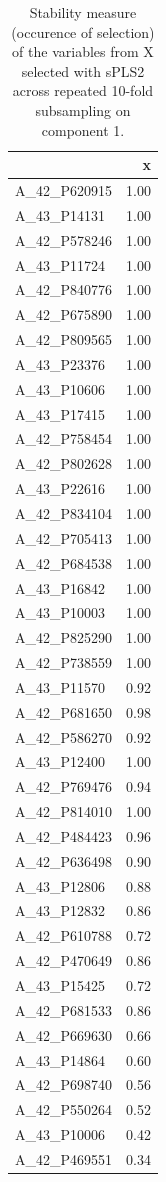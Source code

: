 \documentclass[]{book}
\begin{document}
\begin{longtable}[t]{l|r}
\caption{\label{tab:pls2stability}Stability measure (occurence of selection) of the variables from X selected with sPLS2 across repeated 10-fold subsampling on component 1.}\\
\hline
  & x\\
\hline
A\_42\_P620915 & 1.00\\
\hline
A\_43\_P14131 & 1.00\\
\hline
A\_42\_P578246 & 1.00\\
\hline
A\_43\_P11724 & 1.00\\
\hline
A\_42\_P840776 & 1.00\\
\hline
A\_42\_P675890 & 1.00\\
\hline
A\_42\_P809565 & 1.00\\
\hline
A\_43\_P23376 & 1.00\\
\hline
A\_43\_P10606 & 1.00\\
\hline
A\_43\_P17415 & 1.00\\
\hline
A\_42\_P758454 & 1.00\\
\hline
A\_42\_P802628 & 1.00\\
\hline
A\_43\_P22616 & 1.00\\
\hline
A\_42\_P834104 & 1.00\\
\hline
A\_42\_P705413 & 1.00\\
\hline
A\_42\_P684538 & 1.00\\
\hline
A\_43\_P16842 & 1.00\\
\hline
A\_43\_P10003 & 1.00\\
\hline
A\_42\_P825290 & 1.00\\
\hline
A\_42\_P738559 & 1.00\\
\hline
A\_43\_P11570 & 0.92\\
\hline
A\_42\_P681650 & 0.98\\
\hline
A\_42\_P586270 & 0.92\\
\hline
A\_43\_P12400 & 1.00\\
\hline
A\_42\_P769476 & 0.94\\
\hline
A\_42\_P814010 & 1.00\\
\hline
A\_42\_P484423 & 0.96\\
\hline
A\_42\_P636498 & 0.90\\
\hline
A\_43\_P12806 & 0.88\\
\hline
A\_43\_P12832 & 0.86\\
\hline
A\_42\_P610788 & 0.72\\
\hline
A\_42\_P470649 & 0.86\\
\hline
A\_43\_P15425 & 0.72\\
\hline
A\_42\_P681533 & 0.86\\
\hline
A\_42\_P669630 & 0.66\\
\hline
A\_43\_P14864 & 0.60\\
\hline
A\_42\_P698740 & 0.56\\
\hline
A\_42\_P550264 & 0.52\\
\hline
A\_43\_P10006 & 0.42\\
\hline
A\_42\_P469551 & 0.34\\
\hline
\end{longtable}
\end{document}
